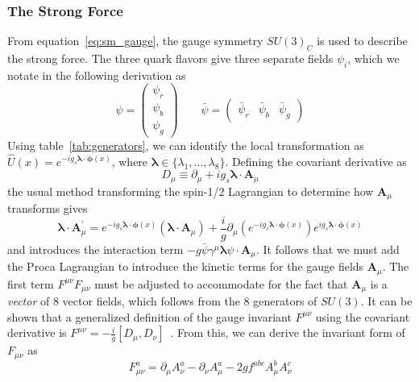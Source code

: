 \subsubsection{The Strong Force} \label{sec:sm_theory_strong}
From equation~\ref{eq:sm_gauge}, the gauge symmetry $SU(3)_C$ is used to describe the strong force. The three quark flavors give three separate fields $\psi_i$, which we notate in the following derivation as
\begin{equation}
	\psi=\begin{pmatrix}\psi_r\\ \psi_b \\ \psi_g\end{pmatrix} \qquad \bar{\psi}=\begin{pmatrix}\bar{\psi}_r & \bar{\psi}_b & \bar{\psi}_g\end{pmatrix}
\end{equation}
Using table~\ref{tab:generators}, we can identify the local transformation as $\hat{U}(x)=e^{-ig_s\boldsymbol{\lambda}\cdot\boldsymbol{\phi}(x)}$, where $\boldsymbol{\lambda}\in\{\lambda_1,...,\lambda_8\}$. Defining the covariant derivative as
\begin{equation}
	D_\mu\equiv\partial_\mu+ig_s\boldsymbol{\lambda}\cdot \mathbf{A}_\mu
\end{equation}
the usual method transforming the spin-1/2 Lagrangian to determine how $\mathbf{A}_\mu$ transforms gives
\begin{equation}
	\boldsymbol{\lambda}\cdot\mathbf{A}^\prime_\mu=e^{-ig_s\boldsymbol{\lambda}\cdot\boldsymbol{\phi}(x)}\left(\boldsymbol{\lambda}\cdot\mathbf{A}_\mu\right)+\frac{i}{g}\partial_\mu\left(e^{-ig_s\boldsymbol{\lambda}\cdot\boldsymbol{\phi}(x)}\right)e^{ig_s\boldsymbol{\lambda}\cdot\boldsymbol{\phi}(x)}
\end{equation}
and introduces the interaction term $-g\bar{\psi}\gamma^\mu\boldsymbol{\lambda}\psi\cdot\mathbf{A}_\mu$. It follows that we must add the Proca Lagrangian to introduce the kinetic terms for the gauge fields $\mathbf{A}_\mu$. The first term $F^{\mu\nu}F_{\mu\nu}$ must be adjusted to accommodate for the fact that $\mathbf{A}_\mu$ is a \textit{vector} of 8 vector fields, which follows from the 8 generators of $SU(3)$. It can be shown that a generalized definition of the gauge invariant $F^{\mu\nu}$ using the covariant derivative is $F^{\mu\nu}=-\frac{i}{g}[D_\mu,D_\nu]$~\cite{flournoy}. From this, we can derive the invariant form of $F_{\mu\nu}$ as
\begin{equation}
	\label{eq:qcd_fmunu}
	F_{\mu\nu}^a=\partial_\mu A^a_\nu-\partial_\nu A^a_\mu-2gf^{abc}A^b_\mu A^c_\nu
\end{equation}
